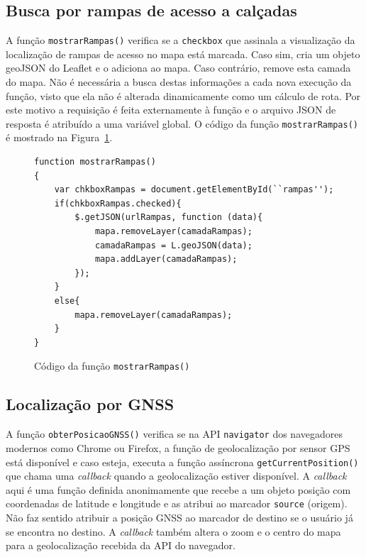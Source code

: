 \documentclass[oneside,openright,12pt]{ufsm_2015} %
\begin{document}
\subsection{Busca por rampas de acesso a calçadas}

A função {\tt mostrarRampas()} verifica se a {\tt checkbox} que assinala a visualização da localização de rampas de acesso no mapa está marcada. Caso sim, cria um objeto geoJSON do Leaflet e o adiciona ao mapa. 
Caso contrário, remove esta camada do mapa. Não é necessária a busca destas informações a cada nova execução da função, visto que ela não é alterada dinamicamente como um cálculo de rota. Por este motivo a requisição é feita externamente à função e o arquivo JSON de resposta é atribuído a uma variável global. O código da função {\tt mostrarRampas()} é mostrado na Figura~\ref{codigo:mostrarampas}.
\begin{figure}
    \centering

    \caption{Código da função \tt{mostrarRampas()}}
    \label{codigo:mostrarampas}

\begin{lstlisting}[]
function mostrarRampas()
{
    var chkboxRampas = document.getElementById(``rampas'');
    if(chkboxRampas.checked){
        $.getJSON(urlRampas, function (data){
            mapa.removeLayer(camadaRampas);
            camadaRampas = L.geoJSON(data);
            mapa.addLayer(camadaRampas);
        });
    }
    else{
        mapa.removeLayer(camadaRampas);
    }
}
\end{lstlisting}
 \end{figure}
 
\subsection{Localização por GNSS}
A função {\tt obterPosicaoGNSS()} verifica se na API {\tt navigator} dos navegadores modernos como Chrome ou Firefox, a função de geolocalização por sensor GPS está disponível e caso esteja, executa a função assíncrona {\tt getCurrentPosition()} que chama uma \textit{callback} quando a geolocalização estiver disponível.
A \textit{callback} aqui é uma função definida anonimamente que recebe a um objeto posição com coordenadas de latitude e longitude e as atribui ao marcador {\tt source} (origem). 
Não faz sentido atribuir a posição GNSS ao marcador de destino se o usuário já se encontra no destino.
A \textit{callback} também altera o zoom e o centro do mapa para a geolocalização recebida da API do navegador. 
\end{document}
